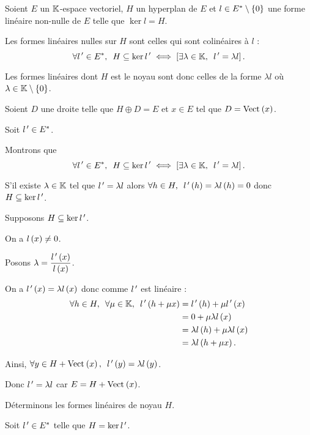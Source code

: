 \begin{prop}
Soient \(E\) un \(\mathbb{K}\)-espace vectoriel, \(H\) un hyperplan de \(E\) et \(l\in E^{*}\setminus\left\lbrace0\right\rbrace\) une forme linéaire non-nulle de \(E\) telle que \(\ker l=H\).

Les formes linéaires nulles sur \(H\) sont celles qui sont colinéaires à \(l\) : \[\quantifs{\forall l\prim\in E\etoile}H\subset\ker l\prim\ssi\croch{\quantifs{\exists\lambda\in\K}l\prim=\lambda l}.\]

Les formes linéaires dont \(H\) est le noyau sont donc celles de la forme \(\lambda l\) où \(\lambda\in\mathbb{K}\setminus\left\lbrace0\right\rbrace\).
\end{prop}

\begin{dem}
Soient \(D\) une droite telle que \(H\oplus D=E\) et \(x\in E\) tel que \(D=\Vect{x}\).

Soit \(l^{\,\prime}\in E^{*}\).

Montrons que \[\quantifs{\forall l\prim\in E\etoile}H\subset\ker l\prim\ssi\croch{\quantifs{\exists\lambda\in\K}l\prim=\lambda l}.\]

\imprec S'il existe \(\lambda\in\mathbb{K}\) tel que \(l^{\,\prime}=\lambda l\) alors \(\quantifs{\forall h\in H}l\prim\paren{h}=\lambda l\paren{h}=0\) donc \(H\subseteq\ker l^{\,\prime}\).

\impdir

Supposons \(H\subseteq\ker l^{\,\prime}\).

On a \(l\left(x\right)\not=0\).

Posons \(\lambda=\dfrac{l^{\,\prime}\left(x\right)}{l\left(x\right)}\).

On a \(l^{\,\prime}\left(x\right)=\lambda l\left(x\right)\) donc comme \(l^{\,\prime}\) est linéaire : \[\begin{aligned}
\quantifs{\forall h\in H;\forall\mu\in\K}l\prim\paren{h+\mu x}&=l\prim\paren{h}+\mu l\prim\paren{x} \\
&=0+\mu\lambda l\paren{x} \\
&=\lambda l\paren{h}+\mu\lambda l\paren{x} \\
&=\lambda l\paren{h+\mu x}.
\end{aligned}\]

Ainsi, \(\quantifs{\forall y\in H+\Vect{x}}l\prim\paren{y}=\lambda l\paren{y}\).

Donc \(l^{\,\prime}=\lambda l\) car \(E=H+\Vect{x}\).

Déterminons les formes linéaires de noyau \(H\).

\analyse

Soit \(l^{\,\prime}\in E^{*}\) telle que \(H=\ker l^{\,\prime}\).


\end{dem}
